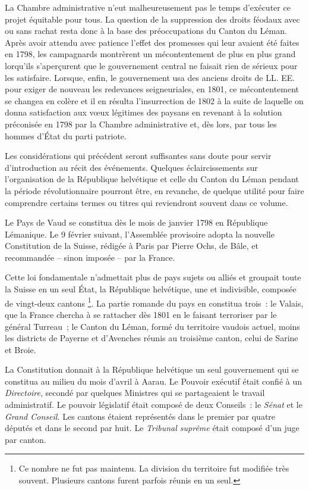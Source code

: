 \documentclass[french,twoside]{book} %
\begin{document}
La Chambre administrative n’eut malheureusement pas le temps d’exécuter ce projet équitable pour tous. La question de la suppression des droits féodaux avec ou sans rachat resta donc à la base des préoccupations du Canton du Léman. Après avoir attendu avec patience l’effet des promesses qui leur avaient été faites en 1798, les campagnards montrèrent un mécontentement de plus en plus grand lorqu’ils s’aperçurent que le gouvernement central ne faisait rien de sérieux pour les satisfaire. Lorsque, enfin, le gouvernement usa des anciens droits de LL. EE. pour exiger de nouveau les redevances seigneuriales, en 1801, ce mécontentement se changea en colère et il en résulta l’insurrection de 1802 à la suite de laquelle on donna satisfaction aux vœux légitimes des paysans en revenant à la solution préconisée en 1798 par la Chambre administrative et, dès lors, par tous les hommes d’État du parti patriote.\par
Les considérations qui précédent seront suffisantes sans doute pour servir d’introduction au récit des événements. Quelques éclaircissements sur l’organisation de la République helvétique et celle du Canton du Léman pendant la période révolutionnaire pourront être, en revanche, de quelque utilité pour faire comprendre certains termes ou titres qui reviendront souvent dans ce volume.\par
Le Pays de Vaud se constitua dès le mois de janvier 1798 en République Lémanique. Le 9 février suivant, l’Assemblée provisoire adopta la nouvelle Constitution de la Suisse, rédigée à Paris par Pierre Ochs, de Bâle, et recommandée – sinon imposée – par la France.\par
Cette loi fondamentale n’admettait plus de pays sujets ou alliés et groupait toute la Suisse en un seul État, la République helvétique, une et indivisible, composée de vingt-deux cantons \footnote{Ce nombre ne fut pas maintenu. La division du territoire fut modifiée très souvent. Plusieurs cantons furent parfois réunis en un seul.}. La partie romande du pays en constitua trois : le Valais, que la France chercha à se rattacher dès 1801 en le faisant terroriser par le général Turreau ; le Canton du Léman, formé du territoire vaudois actuel, moins les districts de Payerne et d’Avenches réunis au troisième canton, celui de Sarine et Broie.\par
La Constitution donnait à la République helvétique un seul gouvernement qui se constitua au milieu du mois d’avril à Aarau. Le Pouvoir exécutif était confié à un \emph{Directoire}, secondé par quelques Ministres qui se partageaient le travail administratif. Le pouvoir législatif était composé de deux Conseils : le \emph{Sénat} et le \emph{Grand Conseil.} Les cantons étaient représentés dans le premier par quatre députés et dans le second par huit. Le \emph{Tribunal suprême} était composé d’un juge par canton.\par
\end{document}
